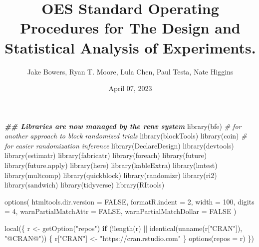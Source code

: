 \documentclass[
  12pt,
]{book}
\title{OES Standard Operating Procedures for The Design and Statistical
Analysis of Experiments.}
\author{Jake Bowers, Ryan T. Moore, Lula Chen, Paul Testa, Nate Higgins}
\date{April 07, 2023}
\newenvironment{Shaded}{\begin{snugshade}}{\end{snugshade}}
\newcommand{\AttributeTok}[1]{\textcolor[rgb]{0.77,0.63,0.00}{#1}}
\newcommand{\CommentTok}[1]{\textcolor[rgb]{0.56,0.35,0.01}{\textit{#1}}}
\newcommand{\ConstantTok}[1]{\textcolor[rgb]{0.00,0.00,0.00}{#1}}
\newcommand{\ControlFlowTok}[1]{\textcolor[rgb]{0.13,0.29,0.53}{\textbf{#1}}}
\newcommand{\DecValTok}[1]{\textcolor[rgb]{0.00,0.00,0.81}{#1}}
\newcommand{\DocumentationTok}[1]{\textcolor[rgb]{0.56,0.35,0.01}{\textbf{\textit{#1}}}}
\newcommand{\FunctionTok}[1]{\textcolor[rgb]{0.00,0.00,0.00}{#1}}
\newcommand{\NormalTok}[1]{#1}
\newcommand{\OtherTok}[1]{\textcolor[rgb]{0.56,0.35,0.01}{#1}}
\newcommand{\SpecialCharTok}[1]{\textcolor[rgb]{0.00,0.00,0.00}{#1}}
\newcommand{\StringTok}[1]{\textcolor[rgb]{0.31,0.60,0.02}{#1}}
\theoremstyle{definition}
\theoremstyle{definition}
\theoremstyle{definition}
\theoremstyle{remark}
\begin{document}
\frontmatter
\maketitle

{
\hypersetup{linkcolor=}
\setcounter{tocdepth}{1}
\tableofcontents
}
\listoffigures
\listoftables
\mainmatter
\begin{Shaded}
\begin{Highlighting}[]
\DocumentationTok{\#\# Libraries are now managed by the renv system}
\FunctionTok{library}\NormalTok{(bfe) }\CommentTok{\# for another approach to block randomized trials}
\FunctionTok{library}\NormalTok{(blockTools)}
\FunctionTok{library}\NormalTok{(coin) }\CommentTok{\# for easier randomization inference}
\FunctionTok{library}\NormalTok{(DeclareDesign)}
\FunctionTok{library}\NormalTok{(devtools)}
\FunctionTok{library}\NormalTok{(estimatr)}
\FunctionTok{library}\NormalTok{(fabricatr)}
\FunctionTok{library}\NormalTok{(foreach)}
\FunctionTok{library}\NormalTok{(future)}
\FunctionTok{library}\NormalTok{(future.apply)}
\FunctionTok{library}\NormalTok{(here)}
\FunctionTok{library}\NormalTok{(kableExtra)}
\FunctionTok{library}\NormalTok{(lmtest)}
\FunctionTok{library}\NormalTok{(multcomp)}
\FunctionTok{library}\NormalTok{(quickblock)}
\FunctionTok{library}\NormalTok{(randomizr)}
\FunctionTok{library}\NormalTok{(ri2)}
\FunctionTok{library}\NormalTok{(sandwich)}
\FunctionTok{library}\NormalTok{(tidyverse)}
\FunctionTok{library}\NormalTok{(RItools)}

\FunctionTok{options}\NormalTok{(}
  \AttributeTok{htmltools.dir.version =} \ConstantTok{FALSE}\NormalTok{, }\AttributeTok{formatR.indent =} \DecValTok{2}\NormalTok{,}
  \AttributeTok{width =} \DecValTok{100}\NormalTok{, }\AttributeTok{digits =} \DecValTok{4}\NormalTok{, }\AttributeTok{warnPartialMatchAttr =} \ConstantTok{FALSE}\NormalTok{, }\AttributeTok{warnPartialMatchDollar =} \ConstantTok{FALSE}
\NormalTok{)}

\FunctionTok{local}\NormalTok{(\{}
\NormalTok{  r }\OtherTok{\textless{}{-}} \FunctionTok{getOption}\NormalTok{(}\StringTok{"repos"}\NormalTok{)}
  \ControlFlowTok{if}\NormalTok{ (}\SpecialCharTok{!}\FunctionTok{length}\NormalTok{(r) }\SpecialCharTok{||} \FunctionTok{identical}\NormalTok{(}\FunctionTok{unname}\NormalTok{(r[}\StringTok{"CRAN"}\NormalTok{]), }\StringTok{"@CRAN@"}\NormalTok{)) \{}
\NormalTok{    r[}\StringTok{"CRAN"}\NormalTok{] }\OtherTok{\textless{}{-}} \StringTok{"https://cran.rstudio.com"}
\NormalTok{  \}}
  \FunctionTok{options}\NormalTok{(}\AttributeTok{repos =}\NormalTok{ r)}
\NormalTok{\})}
\end{Highlighting}
\end{Shaded}
\end{document}
